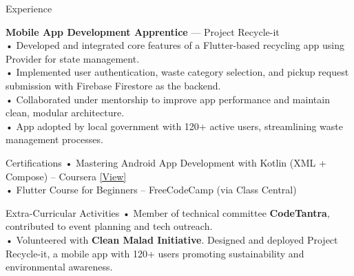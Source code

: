 \documentclass[10pt]{resume}
\begin{document}
\begin{rSection}{Experience}
\vspace{-0.75em}

\item \textbf{Mobile App Development Apprentice} — Project Recycle-it \\
• Developed and integrated core features of a Flutter-based recycling app using Provider for state management. \\
• Implemented user authentication, waste category selection, and pickup request submission with Firebase Firestore as the backend. \\
• Collaborated under mentorship to improve app performance and maintain clean, modular architecture. \\
• App adopted by local government with 120+ active users, streamlining waste management processes.

\end{rSection}



\begin{rSection}{Certifications}
\vspace{-0.5em}
• Mastering Android App Development with Kotlin (XML + Compose) – Coursera \href{https://www.udemy.com/certificate/UC-070146a7-cdbf-4be6-b49b-6bd2ab065a74/}{[View]} \\
• Flutter Course for Beginners – FreeCodeCamp (via Class Central)
\end{rSection}


\begin{rSection}{Extra-Curricular Activities}
\vspace{-0.5em}
• Member of technical committee \textbf{CodeTantra}, contributed to event planning and tech outreach. \\
• Volunteered with \textbf{Clean Malad Initiative}. Designed and deployed Project Recycle-it, a mobile app with 120+ users promoting sustainability and environmental awareness.
\end{rSection}
\end{document}

